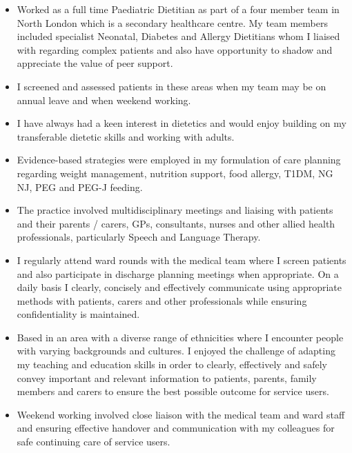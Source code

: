 \documentclass[]{article}
\providecommand{\tightlist}{%
  \setlength{\itemsep}{0pt}\setlength{\parskip}{0pt}}
\begin{document}
\begin{itemize}
  \begin{itemize}
  \tightlist
  \item
    Worked as a full time Paediatric Dietitian as part of a four member
    team in North London which is a secondary healthcare centre. My team
    members included specialist Neonatal, Diabetes and Allergy
    Dietitians whom I liaised with regarding complex patients and also
    have opportunity to shadow and appreciate the value of peer support.
  \item
    I screened and assessed patients in these areas when my team may be
    on annual leave and when weekend working.
  \item
    I have always had a keen interest in dietetics and would enjoy
    building on my transferable dietetic skills and working with adults.
  \item
    Evidence-based strategies were employed in my formulation of care
    planning regarding weight management, nutrition support, food
    allergy, T1DM, NG NJ, PEG and PEG-J feeding.
  \item
    The practice involved multidisciplinary meetings and liaising with
    patients and their parents / carers, GPs, consultants, nurses and
    other allied health professionals, particularly Speech and Language
    Therapy.
  \item
    I regularly attend ward rounds with the medical team where I screen
    patients and also participate in discharge planning meetings when
    appropriate. On a daily basis I clearly, concisely and effectively
    communicate using appropriate methods with patients, carers and
    other professionals while ensuring confidentiality is maintained.
  \item
    Based in an area with a diverse range of ethnicities where I
    encounter people with varying backgrounds and cultures. I enjoyed
    the challenge of adapting my teaching and education skills in order
    to clearly, effectively and safely convey important and relevant
    information to patients, parents, family members and carers to
    ensure the best possible outcome for service users.
  \item
    Weekend working involved close liaison with the medical team and
    ward staff and ensuring effective handover and communication with my
    colleagues for safe continuing care of service users.
  \end{itemize}
\end{itemize}

\pagebreak
\end{document}
